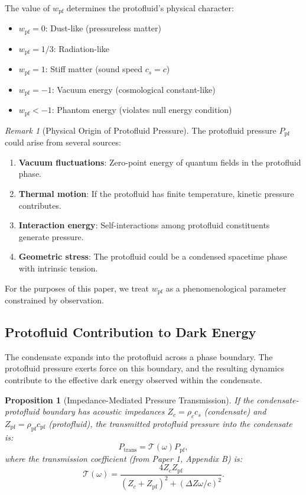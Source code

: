 \documentclass[11pt,a4paper]{article}
\newcommand{\wpf}{\ensuremath{w_{\mathrm{pf}}}}
\newcommand{\Ppf}{\ensuremath{P_{\mathrm{pf}}}}
\newcommand{\rhopf}{\ensuremath{\rho_{\mathrm{pf}}}}
\newtheorem{proposition}[theorem]{Proposition}
\theoremstyle{definition}
\theoremstyle{remark}
\newtheorem{remark}[theorem]{Remark}
\begin{document}
The value of $\wpf$ determines the protofluid's physical character:
\begin{itemize}[leftmargin=*, itemsep=0.2em]
\item $\wpf = 0$: Dust-like (pressureless matter)
\item $\wpf = 1/3$: Radiation-like
\item $\wpf = 1$: Stiff matter (sound speed $c_s = c$)
\item $\wpf = -1$: Vacuum energy (cosmological constant-like)
\item $\wpf < -1$: Phantom energy (violates null energy condition)
\end{itemize}

\begin{remark}[Physical Origin of Protofluid Pressure]
The protofluid pressure $\Ppf$ could arise from several sources:
\begin{enumerate}[label=(\alph*)]
\item \textbf{Vacuum fluctuations}: Zero-point energy of quantum fields in the protofluid phase.
\item \textbf{Thermal motion}: If the protofluid has finite temperature, kinetic pressure contributes.
\item \textbf{Interaction energy}: Self-interactions among protofluid constituents generate pressure.
\item \textbf{Geometric stress}: The protofluid could be a condensed spacetime phase with intrinsic tension.
\end{enumerate}
For the purposes of this paper, we treat $\wpf$ as a phenomenological parameter constrained by observation.
\end{remark}

\subsection{Protofluid Contribution to Dark Energy}
\label{sec:protofluid_dark_energy}

The condensate expands into the protofluid across a phase boundary. The protofluid pressure exerts force on this boundary, and the resulting dynamics contribute to the effective dark energy observed within the condensate.

\begin{proposition}[Impedance-Mediated Pressure Transmission]
\label{prop:impedance_transmission}
If the condensate-protofluid boundary has acoustic impedances $Z_c = \rho_c c_s$ (condensate) and $Z_{\mathrm{pf}} = \rhopf c_{\mathrm{pf}}$ (protofluid), the transmitted protofluid pressure into the condensate is:
\begin{equation}
\label{eq:pressure_transmission}
P_{\mathrm{trans}} = \mathcal{T}(\omega) \Ppf,
\end{equation}
where the transmission coefficient (from Paper 1, Appendix B) is:
\begin{equation}
\mathcal{T}(\omega) = \frac{4 Z_c Z_{\mathrm{pf}}}{(Z_c + Z_{\mathrm{pf}})^2 + (\Delta Z \omega/c)^2}.
\end{equation}
\end{proposition}
\end{document}
